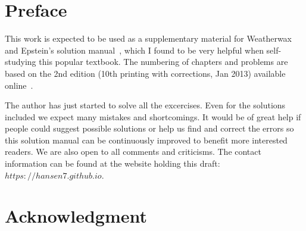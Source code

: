 \chapter*{Preface}

This work is expected to be used as a supplementary material for Weatherwax and
Epstein's solution manual~\cite{weatherwax2013solution}, which I found to be
very helpful when self-studying this popular textbook. The numbering of chapters
and problems are based on the 2nd edition (10th printing with corrections, Jan 2013) available
online~\cite{friedman2009elements}.

The author has just started to solve all the excercises. Even for the solutions
included we expect many mistakes and shortcomings. It would be of great help if
people could suggest possible solutions or help us find and correct the errors
so this solution manual can be continuously improved to benefit more interested
readers. We are also open to all comments and criticisms. The contact
information can be found at the website holding this draft: $https://hansen7.github.io$.


\chapter*{Acknowledgment}
